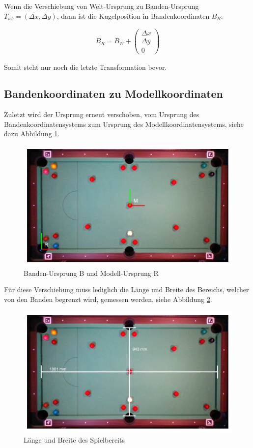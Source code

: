 Wenn die Verschiebung von Welt-Ursprung zu Banden-Ursprung $T_{wb} = (\Delta x, \Delta y)$, dann ist
die Kugelposition in Bandenkoordinaten $B_R$:

\begin{align}
B_R = B_W + \begin{pmatrix}\Delta x\\\Delta y\\0\end{pmatrix}
\end{align}

Somit steht nur noch die letzte Transformation bevor.


\subsection{Bandenkoordinaten zu Modellkoordinaten}\label{kap:rail_to_model}

Zuletzt wird der Ursprung erneut verschoben, vom Ursprung des Bandenkoordinatensystems zum
Ursprung des Modellkoordinatensystems, siehe dazu Abbildung \ref{fig:table_rail_to_model}.

\begin{figure}[h!]
    \begin{center}
    \includegraphics[width=0.6\linewidth]{../common/resources/coordinate_systems/table_rail_to_model.png}
    \end{center}
    \caption{Banden-Ursprung B und Modell-Ursprung R}
    \label{fig:table_rail_to_model}
\end{figure}

Für diese Verschiebung muss lediglich die Länge und Breite des Bereichs, welcher von den Banden begrenzt wird,
gemessen werden, siehe Abbildung \ref{fig:table_inner_lengths}.

\begin{figure}[h!]
    \begin{center}
    \includegraphics[width=0.6\linewidth]{../common/resources/coordinate_systems/table_inner_lengths.png}
    \end{center}
    \caption{Länge und Breite des Spielbereits}
    \label{fig:table_inner_lengths}
\end{figure}

